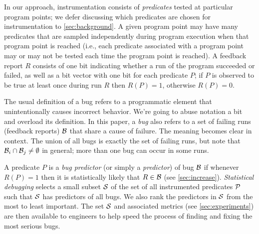 \documentclass[draft]{sig-alternate}
\newcommand{\termdef}[1]{\emph{#1}}
\newcommand{\issue}[2][]{}
\begin{document}
In our approach, instrumentation consists of \termdef{predicates} tested
at particular program points; we defer discussing which predicates are
chosen for instrumentation to \autoref{sec:background}.  A given
program point may have many predicates that are sampled independently
during program execution when that program point is reached (i.e.,
each predicate associated with a program point may or may not be
tested each time the program point is reached).  A feedback report $R$
consists of one bit indicating whether a run of the program
succeeded or failed, as well as a bit vector with one bit for each
predicate $P$; if $P$ is observed to be true at least once during run
$R$ then $R(P) = 1$, otherwise $R(P) = 0$.

\issue[Alice]{Comment about notation: the f(x) usually denotes some
  kind of function, do we want to treat R (a run) as a function?  I'd
  much prefer the subscript or superscript notation, which usually
  refers to an element of a vector.  How about R_P instead of R(P)?
  [I didn't make this change in the text]}
    
\issue{modified by Alice}

The usual definition of a bug refers to a programmatic element that 
unintentionally causes incorrect behavior.  We're going to abuse notation a
bit and overload its definition.  In this paper, a \termdef{bug} also refers to
a set of failing runs (feedback reports) ${\cal B}$
that share a cause of failure.  The meaning becomes clear in context.  The 
union of all bugs is exactly the
set of failing runs, but note that ${\cal B}_i \cap {\cal B}_j \neq
\emptyset$ in general; more than one bug can occur in some runs.

\issue[Mike]{"A bug is a set of failing runs".  Semantically one thinks 
of a bug as someone that characterizes a program, not a set of runs.
What about calling a set of a failing runs a "bug profile"?}

A predicate $P$ is a \termdef{bug predictor} (or simply a \termdef{predictor})
of bug ${\cal B}$ if whenever $R(P) = 1$ then it is statistically
likely that $R \in {\cal B}$ (see \autoref{sec:increase}).
\termdef{Statistical debugging} selects a small subset ${\cal S}$ of the set of
all instrumented predicates ${\cal P}$ such that ${\cal S}$ has
predictors of all bugs.  We also rank the predictors in ${\cal S}$
from the most to least important.  The set ${\cal S}$ and associated
metrics (see \autoref{sec:experiments}) are then available to
engineers to help speed the process of finding and fixing the most
serious bugs.
\end{document}
